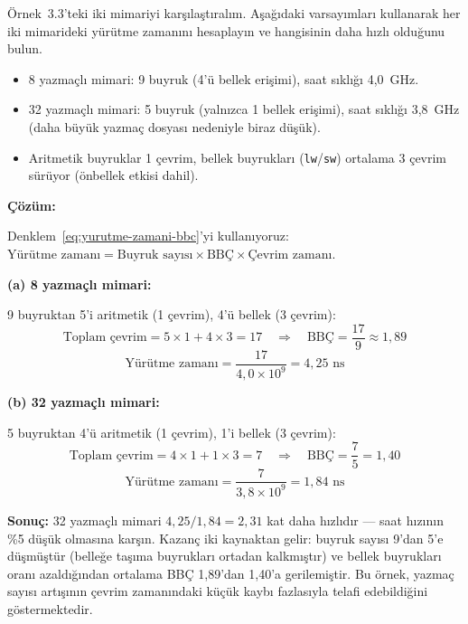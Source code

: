 \begin{ornek}[3.4]
\label{orn:yazmac-basarim}
Örnek~3.3'teki iki mimariyi karşılaştıralım. Aşağıdaki varsayımları kullanarak her iki mimarideki yürütme zamanını hesaplayın ve hangisinin daha hızlı olduğunu bulun.

\begin{itemize}[nosep]
\item 8 yazmaçlı mimari: 9 buyruk (4'ü bellek erişimi), saat sıklığı 4{,}0~GHz.
\item 32 yazmaçlı mimari: 5 buyruk (yalnızca 1 bellek erişimi), saat sıklığı 3{,}8~GHz (daha büyük yazmaç dosyası nedeniyle biraz düşük).
\item Aritmetik buyruklar 1 çevrim, bellek buyrukları (\texttt{lw}/\texttt{sw}) ortalama 3 çevrim sürüyor (önbellek etkisi dahil).
\end{itemize}

\textbf{Çözüm:}

Denklem~\ref{eq:yurutme-zamani-bbc}'yi kullanıyoruz: $\text{Yürütme zamanı} = \text{Buyruk sayısı} \times \text{BBÇ} \times \text{Çevrim zamanı}$.

\medskip
\textbf{(a) 8 yazmaçlı mimari:}

9 buyruktan 5'i aritmetik (1 çevrim), 4'ü bellek (3 çevrim):
\[
\text{Toplam çevrim} = 5 \times 1 + 4 \times 3 = 17 \quad\Rightarrow\quad \text{BBÇ} = \frac{17}{9} \approx 1{,}89
\]
\[
\text{Yürütme zamanı} = \frac{17}{4{,}0 \times 10^{9}} = 4{,}25 \text{ ns}
\]

\textbf{(b) 32 yazmaçlı mimari:}

5 buyruktan 4'ü aritmetik (1 çevrim), 1'i bellek (3 çevrim):
\[
\text{Toplam çevrim} = 4 \times 1 + 1 \times 3 = 7 \quad\Rightarrow\quad \text{BBÇ} = \frac{7}{5} = 1{,}40
\]
\[
\text{Yürütme zamanı} = \frac{7}{3{,}8 \times 10^{9}} = 1{,}84 \text{ ns}
\]

\textbf{Sonuç:} 32 yazmaçlı mimari $4{,}25 / 1{,}84 = 2{,}31$ kat daha hızlıdır --- saat hızının \%5 düşük olmasına karşın. Kazanç iki kaynaktan gelir: buyruk sayısı 9'dan 5'e düşmüştür (belleğe taşıma buyrukları ortadan kalkmıştır) ve bellek buyrukları oranı azaldığından ortalama BBÇ 1{,}89'dan 1{,}40'a gerilemiştir. Bu örnek, yazmaç sayısı artışının çevrim zamanındaki küçük kaybı fazlasıyla telafi edebildiğini göstermektedir.
\end{ornek}

